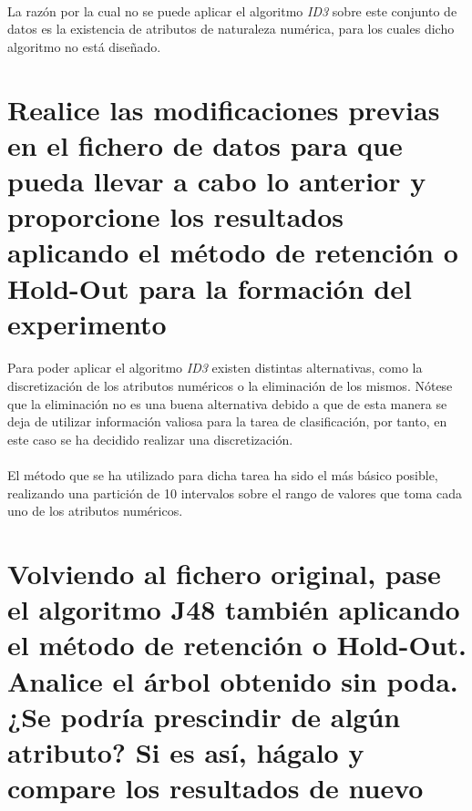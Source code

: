 \documentclass[10pt, a4paper,spanish]{article}
\begin{document}
		\paragraph{}
		La razón por la cual no se puede aplicar el algoritmo \emph{ID3} sobre este conjunto de datos es la existencia de atributos de naturaleza numérica, para los cuales dicho algoritmo no está diseñado.

	\section{Realice las modificaciones previas en el fichero de datos para que pueda llevar a cabo lo anterior y proporcione los resultados aplicando el método de retención o Hold-Out para la formación del experimento}

		\paragraph{}
		Para poder aplicar el algoritmo \emph{ID3} existen distintas alternativas, como la discretización de los atributos numéricos o la eliminación de los mismos. Nótese que la eliminación no es una buena alternativa debido a que de esta manera se deja de utilizar información valiosa para la tarea de clasificación, por tanto, en este caso se ha decidido realizar una discretización.

		\paragraph{}
		El método que se ha utilizado para dicha tarea ha sido el más básico posible, realizando una partición de 10 intervalos sobre el rango de valores que toma cada uno de los atributos numéricos.

		\paragraph{}

	\section{Volviendo al fichero original, pase el algoritmo J48 también aplicando el método de retención o Hold-Out. Analice el árbol obtenido sin poda. ¿Se podría prescindir de algún atributo? Si es así, hágalo y compare los resultados de nuevo}

		\paragraph{}
\end{document}
